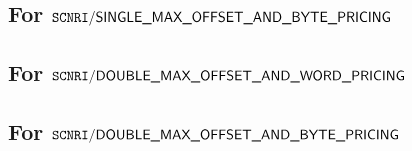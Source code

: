 \subsection{For $\texttt{SCNRI}\textsf{/}{\textsf{SINGLE\_MAX\_OFFSET\_AND\_BYTE\_PRICING}}$}       \label{mxp: computation: single max offset byte}              
\subsection{For $\texttt{SCNRI}\textsf{/}{\textsf{DOUBLE\_MAX\_OFFSET\_AND\_WORD\_PRICING}}$}       \label{mxp: computation: double max offset word}              
\subsection{For $\texttt{SCNRI}\textsf{/}{\textsf{DOUBLE\_MAX\_OFFSET\_AND\_BYTE\_PRICING}}$}       \label{mxp: computation: double max offset byte}              
